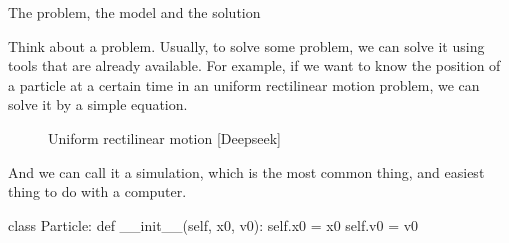 \begin{frame}{The problem, the model and the solution}
  \begin{blur}

  Think about a problem. Usually, to solve some problem, we can solve it
  using tools that are already available. For example, if we want to know
  the position of a particle at a certain time in an uniform rectilinear
  motion problem, we can solve it by a simple equation.
  \begin{figure}[!ht]
    \begin{center}
    \end{center}
    \caption{Uniform rectilinear motion [Deepseek]}
  \end{figure}

  \end{blur}
  \begin{blur}
    And we can call it a simulation, which is the most common thing, and
    easiest thing to do with a computer.
  \end{blur}
  
  \begin{beamerlst}[language=python]
class Particle:
  def __init__(self, x0, v0):
    self.x0 = x0
    self.v0 = v0


\end{beamerlst}
\end{frame}
